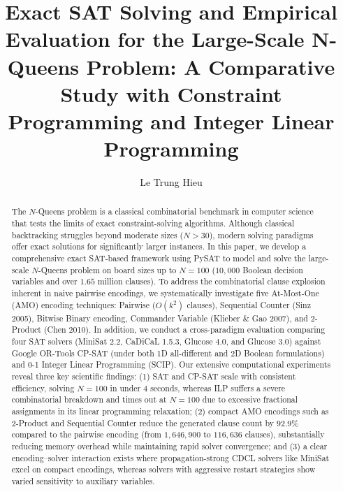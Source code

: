 \documentclass[a4paper,fleqn]{cas-sc}
\begin{document}
\let\WriteBookmarks\relax
\def\floatpagepagefraction{1}
\def\textpagefraction{.001}


\title [mode = title]{Exact SAT Solving and Empirical Evaluation for the Large-Scale N-Queens Problem: A Comparative Study with Constraint Programming and Integer Linear Programming}

\author{Le Trung Hieu}



\begin{abstract}
The $N$-Queens problem is a classical combinatorial benchmark in computer science that tests the limits of exact constraint-solving algorithms. Although classical backtracking struggles beyond moderate sizes ($N > 30$), modern solving paradigms offer exact solutions for significantly larger instances. In this paper, we develop a comprehensive exact SAT-based framework using PySAT to model and solve the large-scale $N$-Queens problem on board sizes up to $N = 100$ ($10,000$ Boolean decision variables and over $1.65$ million clauses). To address the combinatorial clause explosion inherent in naive pairwise encodings, we systematically investigate five At-Most-One (AMO) encoding techniques: Pairwise ($O(k^2)$ clauses), Sequential Counter (Sinz 2005), Bitwise Binary encoding, Commander Variable (Klieber \& Gao 2007), and 2-Product (Chen 2010). In addition, we conduct a cross-paradigm evaluation comparing four SAT solvers (MiniSat 2.2, CaDiCaL 1.5.3, Glucose 4.0, and Glucose 3.0) against Google OR-Tools CP-SAT (under both 1D all-different and 2D Boolean formulations) and 0-1 Integer Linear Programming (SCIP). Our extensive computational experiments reveal three key scientific findings: (1) SAT and CP-SAT scale with consistent efficiency, solving $N=100$ in under 4 seconds, whereas ILP suffers a severe combinatorial breakdown and times out at $N=100$ due to excessive fractional assignments in its linear programming relaxation; (2) compact AMO encodings such as 2-Product and Sequential Counter reduce the generated clause count by $92.9\%$ compared to the pairwise encoding (from $1,646,900$ to $116,636$ clauses), substantially reducing memory overhead while maintaining rapid solver convergence; and (3) a clear encoding--solver interaction exists where propagation-strong CDCL solvers like MiniSat excel on compact encodings, whereas solvers with aggressive restart strategies show varied sensitivity to auxiliary variables.
\end{abstract}
\end{document}
